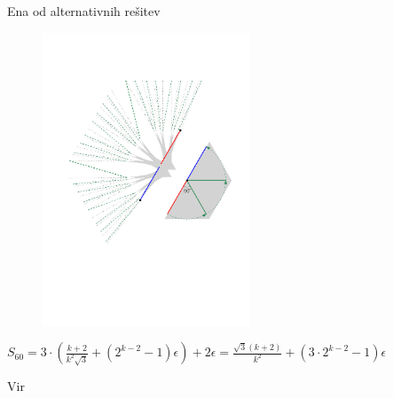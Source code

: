 \documentclass{beamer}
\begin{document}

\begin{frame}{Ena od alternativnih rešitev}
    \begin{figure}
        \centering
        \includegraphics[width=0.55\textwidth]{ipe_slike/koncni_lik_60.pdf}
    \end{figure}
    $ S_{60} = 3 \cdot \left( \frac{k+2}{k^2 \sqrt{3}} + (2^{k-2} - 1) \epsilon \right) + 2\epsilon = \frac{\sqrt{3} (k+2)}{k^2} + (3 \cdot 2^{k-2} -1) \epsilon $

\end{frame}


\begin{frame}{Vir}
    \nocite{*}      %
    
    
\end{frame}

\end{document}
